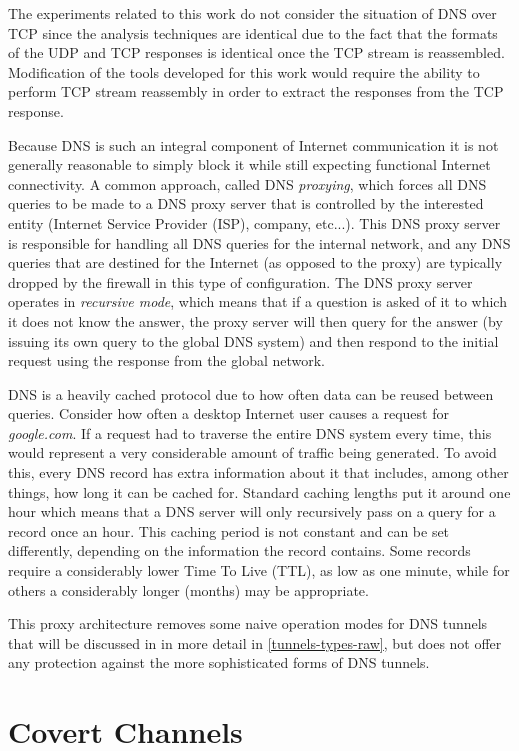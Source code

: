 \documentclass[12pt]{report}
\theoremstyle{remark}
\theoremstyle{definition}
\theoremstyle{definition}
\theoremstyle{definition}
\begin{document}
The experiments related to this work do not consider the situation of DNS over
TCP since the analysis techniques are identical due to the fact that the formats of the UDP and
TCP responses is identical once the TCP stream is reassembled. Modification of
the tools developed for this work would require the ability to perform TCP
stream reassembly in order to extract the responses from the TCP response.

Because DNS is such an integral component of Internet communication it is not
generally reasonable to simply block it while still expecting functional
Internet connectivity. A common approach, called DNS \emph{proxying}, which
forces all DNS queries to be made to a DNS proxy server that is controlled by
the interested entity (Internet Service Provider (ISP), company, etc...). This DNS proxy server is
responsible for handling all DNS queries for the internal network, and any DNS
queries that are destined for the Internet (as opposed to the proxy) are
typically dropped by the firewall in this type of configuration. The DNS proxy
server operates in \emph{recursive mode}, which means that if a question is
asked of it to which it does not know the answer, the proxy server will then
query for the answer (by issuing its own query to the global DNS system) and
then respond to the initial request using the response from the global network.

DNS is a heavily cached protocol due to how often data can be reused between
queries. Consider how often a desktop Internet user causes a request for
\emph{google.com}. If a request had to traverse the entire DNS system every
time, this would represent a very considerable amount of traffic being
generated. To avoid this, every DNS record has extra information about it that
includes, among other things, how long it can be cached for. Standard caching
lengths put it around one hour which means that a DNS server will only
recursively pass on a query for a record once an hour. This caching period is
not constant and can be set differently, depending on the information the record
contains. Some records require a considerably lower Time To Live (TTL), as low
as one minute, while for others a considerably longer (months) may be
appropriate.

This proxy architecture removes some naive operation modes for DNS tunnels that
will be discussed in in more detail in \ref{tunnels-types-raw}, but does not
offer any protection against the more sophisticated forms of DNS tunnels.

\section{Covert Channels}
\end{document}
